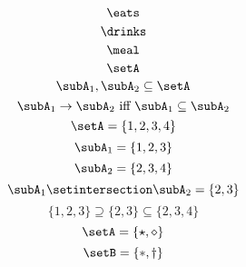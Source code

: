 {\begin{forslides}
\begin{equation}
			\eats
		\end{equation}
		\begin{equation}
			\label{eq:prod-slides-11}
			\drinks
		\end{equation}
		\begin{equation}
			\label{eq:prod-slides-12}
			\meal
		\end{equation}
		\begin{equation}
			\label{eq:prod-slides-13}
			\setA
		\end{equation}
		\begin{equation}
			\label{eq:prod-slides-14}
			\subA_1, \subA_2 \subseteq \setA
		\end{equation}
		\begin{equation}
			\label{eq:prod-slides-15}
			\subA_1 \to \subA_2 \text{ iff } \subA_1 \subseteq \subA_2
		\end{equation}
		\begin{equation}
			\label{eq:prod-slides-16}
			\setA = \{ 1, 2, 3, 4 \}
		\end{equation}
		\begin{equation}
			\label{eq:prod-slides-17}
			\subA_1 = \{ 1, 2, 3 \}
		\end{equation}
		\begin{equation}
			\label{eq:prod-slides-18}
			\subA_2 = \{2, 3, 4 \}
		\end{equation}
		\begin{equation}
			\label{eq:prod-slides-19}
			\subA_1 \setintersection \subA_2 = \{2, 3 \}
		\end{equation}
		\begin{equation}
			\label{eq:prod-slides-20}
			\{ 1, 2, 3 \} \supseteq \{2, 3 \} \subseteq \{2, 3, 4 \}
		\end{equation}
		\begin{equation}
			\label{eq:coprod-slides-1}
			\setA=\{\star, \diamond\}
		\end{equation}
		\begin{equation}
			\label{eq:coprod-slides-2}
			\setB=\{\ast, \dagger\}
		\end{equation}
	\end{forslides}
}

